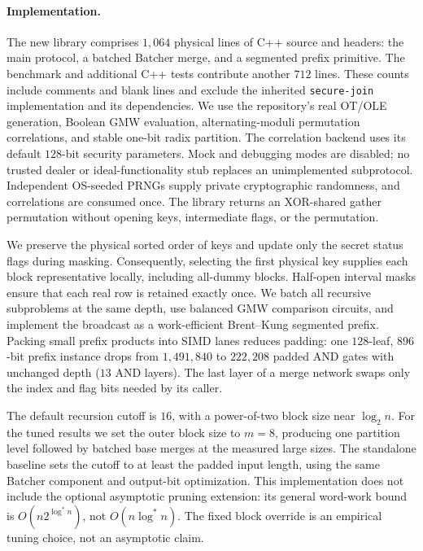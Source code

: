\paragraph{Implementation.}
The new library comprises $1{,}064$ physical lines of C++ source and headers:
the main protocol, a batched Batcher merge, and a segmented prefix primitive.
The benchmark and additional C++ tests contribute another $712$ lines.
These counts include comments and blank lines and exclude the inherited
\texttt{secure-join} implementation and its dependencies.
We use the repository's real OT/OLE generation, Boolean GMW evaluation,
alternating-moduli permutation correlations, and stable one-bit radix partition.
The correlation backend uses its default $128$-bit security parameters.
Mock and debugging modes are disabled; no trusted dealer or ideal-functionality
stub replaces an unimplemented subprotocol. Independent OS-seeded PRNGs supply
private cryptographic randomness, and correlations are consumed once.
The library returns an XOR-shared gather permutation without opening keys,
intermediate flags, or the permutation.

We preserve the physical sorted order of keys and update only the secret status
flags during masking. Consequently, selecting the first physical key supplies
each block representative locally, including all-dummy blocks. Half-open
interval masks ensure that each real row is retained exactly once. We batch all
recursive subproblems at the same depth, use balanced GMW comparison circuits,
and implement the broadcast as a work-efficient Brent--Kung segmented prefix.
Packing small prefix products into SIMD lanes reduces padding: one
$128$-leaf, $896$-bit prefix instance drops from $1{,}491{,}840$ to $222{,}208$
padded AND gates with unchanged depth ($13$ AND layers). The last layer of a
merge network swaps only the index and flag bits needed by its caller.

The default recursion cutoff is $16$, with a power-of-two block size near
$\log_2 n$. For the tuned results we set the outer block size to $m=8$, producing
one partition level followed by batched base merges at the measured large sizes.
The standalone baseline sets the cutoff to at least the padded input length,
using the same Batcher component and output-bit optimization.
This implementation does not include the optional asymptotic pruning extension:
its general word-work bound is $O(n2^{\log^* n})$, not $O(n\log^* n)$.
The fixed block override is an empirical tuning choice, not an asymptotic claim.

